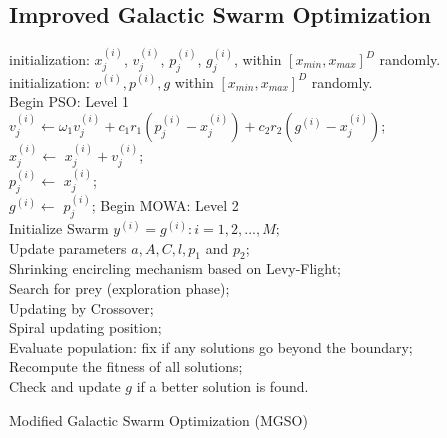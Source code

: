\documentclass[a4paper]{article}
\begin{document}
\subsection{Improved Galactic Swarm Optimization}
\begin{algorithm}[H]
\SetAlgoLined
 initialization: $x_j^{(i)}$, $v_j^{(i)}$, $p_j^{(i)}$, $g_j^{(i)}$, within $[x_{min}, x_{max}]^D$ randomly. \\
 initialization: $v^{(i)}, p^{(i)}, g$ within $[x_{min}, x_{max}]^D$ randomly. \\
 {
 	Begin PSO: Level 1 \\
	{
		{
			{
				$v_j^{(i)}\gets\omega_1v_j^{(i)} + c_1r_1(p_j^{(i)} - x_j^{(i)}) + c_2r_2(g^{(i)} - x_j^{(i)})$; \\
				$x_j^{(i)}\gets$ $x_j^{(i)} + v_j^{(i)}$; \\
				{
					$p_j^{(i)}\gets$ $x_j^{(i)}$; \\
					{
						$g^{(i)}\gets$ $p_j^{(i)}$;
					}
				}
			}
		}
	}
	Begin MOWA: Level 2 \\
	Initialize Swarm $y^{(i)} = g^{(i)}: i = 1, 2, ..., M;$ \\
	{
		{
			Update parameters $a, A, C, l, p_1$ and $p_2$; \\ 	
			{
				{
					Shrinking encircling mechanism based on Levy-Flight;\\
				}
				{	
					Search for prey (exploration phase);\\
			 
				}
			}
			{
				{
					Updating by Crossover; \\
				}
				{
					Spiral updating position; \\
				}
			}
			Evaluate population: fix if any solutions go beyond the boundary;\\
 			Recompute the fitness of all solutions;\\
 			Check and update $g$ if a better solution is found. \\			
		}
	} 	
 }
 \caption{Modified Galactic Swarm Optimization (MGSO)}
\end{algorithm}
\end{document}
